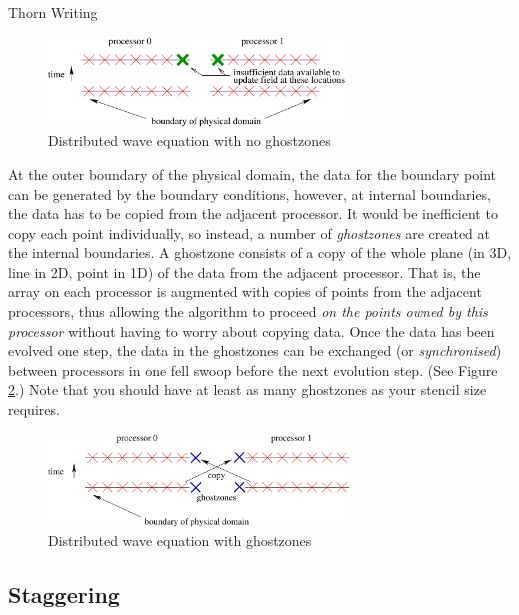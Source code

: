 \begin{cactuspart}{Thorn Writing}
\begin{figure}[ht]
\begin{center}
\includegraphics[angle=0,width=8cm]{1dnoghost}
\end{center}
\caption{Distributed wave equation with no ghostzones}
\label{fig:noghost}
\end{figure}

At the outer boundary of the physical domain, the data for the boundary
point can be generated by the boundary conditions, however, at internal
boundaries, the data has to be copied from the adjacent processor.  It
would be inefficient to copy each point individually, so instead, a
number of \textit{ghostzones} are created at the internal boundaries.  A
ghostzone consists of a copy of the whole plane (in 3D, line in 2D,
point in 1D) of the data from the adjacent processor.  That is, the array
on each processor is augmented with copies of points from the adjacent
processors, thus allowing the algorithm to proceed \textit{on the points
owned by this processor} without having to worry about copying data.
Once the data has been evolved one step, the data in the ghostzones
can be exchanged (or \textit{synchronised}) between processors in one
fell swoop before the next evolution step.  (See Figure
\ref{fig:withghost}.)  Note that you should have at least as many
ghostzones as your stencil size requires.

\begin{figure}[ht]
\begin{center}
\includegraphics[angle=0,width=8cm]{withghost}
\end{center}
\caption{Distributed wave equation with ghostzones}
\label{fig:withghost}
\end{figure}


\subsection{Staggering}
\label{sec:staggering}


\end{cactuspart}
